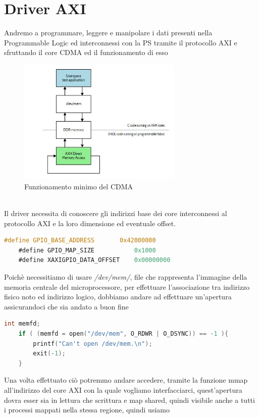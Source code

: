 \section{Driver AXI}
Andremo a programmare, leggere e manipolare i dati presenti nella Programmable Logic ed interconnessi con la PS tramite il protocollo AXI e sfruttando il core CDMA ed il funzionamento di esso
\begin{figure}
    \centering
    \includegraphics[width=0.7\textwidth]{images/AXI7.jpg}
    \caption{Funzionamento minimo del CDMA}
    \label{fig:my_label}
\end{figure}\\
Il driver necessita di conoscere gli indirizzi base dei core interconnessi al protocollo AXI e la loro dimensione ed eventuale offset.
\begin{lstlisting}[language=C, label=lst:C, caption={Definizione costanti}]
    #define GPIO_BASE_ADDRESS       0x42000000
    #define GPIO_MAP_SIZE           0x1000
    #define XAXIGPIO_DATA_OFFSET    0x00000000
\end{lstlisting}
Poichè necessitiamo di usare \textit{/dev/mem/}, file che rappresenta l'immagine della memoria centrale del microprocessore, per effettuare l'associazione tra indirizzo fisico noto ed indirizzo logico, dobbiamo andare ad effettuare un'apertura assicurandoci che sia andato a buon fine
\begin{lstlisting}[language=C, label=lst:C, caption={Apertura file mem}]
    int memfd;
    if ( (memfd = open("/dev/mem", O_RDWR | O_DSYNC)) == -1 ){
        printf("Can't open /dev/mem.\n");
        exit(-1);
    }
\end{lstlisting}
Una volta effettuato ciò potremmo andare accedere, tramite la funzione mmap all'indirizzo del core AXI con la quale vogliamo interfacciarci, quest'apertura dovra esser sia in lettura che scrittura e map shared, quindi visibile anche a tutti i processi mappati nella stessa regione, quindi usiamo
